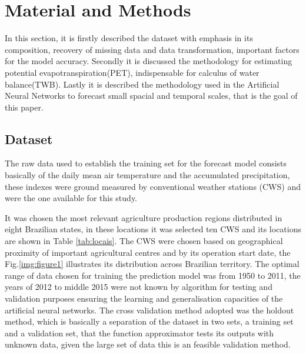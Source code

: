 \chapter{Material and Methods}
\label{cap:linux}
\vspace{-2cm}

In this section, it is firstly described the dataset with emphasis in its composition, recovery of missing data and data transformation, important factors for the model accuracy. Secondly it is discussed the methodology for estimating potential evapotranspiration(PET), indispensable for calculus of water balance(TWB).
Lastly it is described the methodology used in the Artificial Neural Networks to forecast small spacial and temporal scales, that is the goal of this paper.

\section{Dataset}

The raw data used to establish the training set for the forecast model consists basically of the daily mean air temperature and the accumulated precipitation, these indexes were ground measured by conventional weather stations (CWS) and were the one available for this study.

It was chosen the most relevant agriculture production regions distributed in eight Brazilian states, in these locations it was selected ten CWS and its locations are shown in Table \ref{tab:locais}. 
The CWS were chosen based on geographical proximity of important agricultural centres and by its operation start date, the Fig.\ref{img:figure1} illustrates its distribution across Brazilian territory. The optimal range of data chosen for training the prediction model was from 1950 to 2011, the years of 2012 to middle 2015 were not known by algorithm for testing and validation purposes ensuring the learning and generalisation capacities of the artificial neural networks. The cross validation method adopted was the holdout method, which is basically a separation of the dataset in two sets, a training set and a validation set, that the function approximator tests its outputs with unknown data, given the large set of data this is an feasible validation method\cite{friedman2001elements}.

